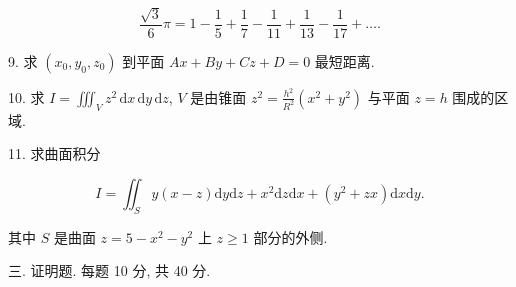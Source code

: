 \documentclass{examcollection}
\renewcommand{\displayformula}[1]{\[#1\]}
\begin{document}
{\begin{minipage}{\textwidth}
\displayformula{\frac {\sqrt {3}}{6} \pi = 1 - \frac {1}{5} + \frac {1}{7} - \frac {1}{11} + \frac {1}{13} - \frac {1}{17} + \dots .}\par
9. 求 $(x_0, y_0, z_0)$ 到平面 $Ax + By + Cz + D = 0$ 最短距离.\par
10. 求 $I = \iiint_{V} z^{2} \, \mathrm{d}x \, \mathrm{d}y \, \mathrm{d}z$, $V$ 是由锥面 $z^{2} = \frac{h^{2}}{R^{2}} (x^{2} + y^{2})$ 与平面 $z = h$ 围成的区域.\par
11. 求曲面积分\par
\displayformula{I = \iint_ {S} y (x - z) \mathrm{d} y \mathrm{d} z + x ^ {2} \mathrm{d} z \mathrm{d} x + (y ^ {2} + z x) \mathrm{d} x \mathrm{d} y.}\par
其中 $S$ 是曲面 $z = 5 - x^{2} - y^{2}$ 上 $z \geq 1$ 部分的外侧.\par
三. 证明题. 每题 10 分, 共 40 分.\par
\end{minipage}}
\ifdim\dimexpr\ht\proofbox+\dp\proofbox\relax>\textheight
\noindent\resizebox{!}{\textheight}{\usebox{\proofbox}}\else\noindent\usebox{\proofbox}\fi\clearpage
\end{document}
